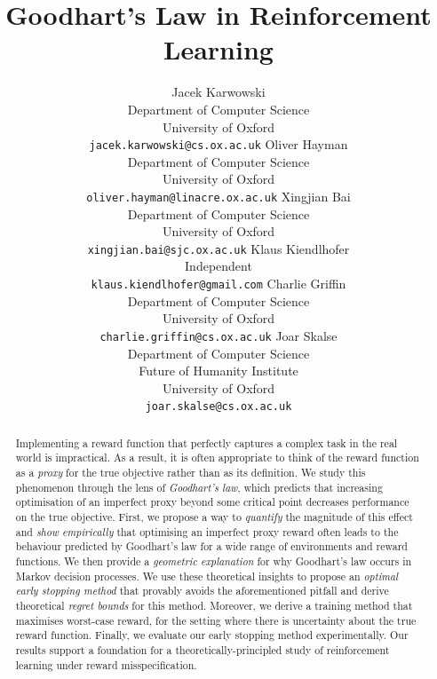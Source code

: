\documentclass{article} %
\title{Goodhart's Law in Reinforcement Learning}
\author{Jacek Karwowski\\
Department of Computer Science\\
University of Oxford\\
\texttt{jacek.karwowski@cs.ox.ac.uk}
\And
Oliver Hayman\\
Department of Computer Science\\
University of Oxford\\
\texttt{oliver.hayman@linacre.ox.ac.uk}
\And
Xingjian Bai\\
Department of Computer Science\\
University of Oxford\\
\texttt{xingjian.bai@sjc.ox.ac.uk}
\And
Klaus Kiendlhofer\\
Independent\\
\texttt{klaus.kiendlhofer@gmail.com}
\And
Charlie Griffin\\
Department of Computer Science\\
University of Oxford\\
\texttt{charlie.griffin@cs.ox.ac.uk}
\And
Joar Skalse\\
Department of Computer Science\\
Future of Humanity Institute\\
University of Oxford\\
\texttt{joar.skalse@cs.ox.ac.uk}
}
\begin{document}
\maketitle


\begin{abstract}
Implementing a reward function that perfectly captures a complex task in the real world is impractical. As a result, it is often appropriate to think of the reward function as a \emph{proxy} for the true objective rather than as its definition. We study this phenomenon through the lens of \emph{Goodhart’s law}, which predicts that increasing optimisation of an imperfect proxy beyond some critical point decreases performance on the true objective. First, we propose a way to \emph{quantify} the magnitude of this effect and \emph{show empirically} that optimising an imperfect proxy reward often leads to the behaviour predicted by Goodhart’s law for a wide range of environments and reward functions. We then provide a \emph{geometric explanation} for why Goodhart's law occurs in Markov decision processes. We use these theoretical insights to propose an \emph{optimal early stopping method} that provably avoids the aforementioned pitfall and derive theoretical \emph{regret bounds} for this method. Moreover, we derive a training method that maximises worst-case reward, for the setting where there is uncertainty about the true reward function. Finally, we evaluate our early stopping method experimentally. Our results support a foundation for a theoretically-principled study of reinforcement learning under reward misspecification.
\end{abstract}












% 

\appendix











\end{document}
